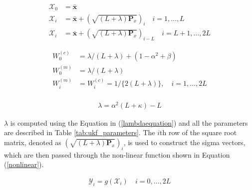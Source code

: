 \begin{equation}
\begin{aligned}
    \mathcal{X}_0 &= \bar{\mathbf{x}} \\
    \mathcal{X}_i &= \bar{\mathbf{x}} + \left(\sqrt{(L+\lambda)\mathbf{P}_x}\right)_i \quad i = 1,\ldots,L \\
    \mathcal{X}_i &= \bar{\mathbf{x}} + \left(\sqrt{(L+\lambda)\mathbf{P}_x}\right)_{i-L} \quad i = L+1,\ldots,2L
\end{aligned}
\label{ukf_equations1}
\end{equation}

\begin{equation}
\begin{aligned}
    W^{(c)}_0 &= \lambda / (L + \lambda) + (1-\alpha^2 +\beta) \\
    W^{(m)}_0 &= \lambda / (L + \lambda) \\
    W^{(m)}_i &= W^{(c)}_i  = 1/\{2(L + \lambda)\}, \quad i = 1,\ldots,2L\\    
\end{aligned}
\label{ukf_equations2}
\end{equation}

\begin{equation}
\begin{aligned}
    \lambda = \alpha^2(L+\kappa) - L
    \label{lambdaequation}
\end{aligned}
\end{equation}

\(\lambda\) is computed using the Equation in (\ref{lambdaequation}) and all the parameters are described in Table \ref{tab:ukf_parameters}. The \( i \)th row of the square root matrix, denoted as \( \left(\sqrt{(L+\lambda)\mathbf{P}_x}\right)_i \), is used to construct the sigma vectors, which are then passed through the non-linear function shown in Equation (\ref{nonlinear}).


\begin{equation}
    \begin{aligned}
        \mathcal{Y}_i = g(\mathcal{X}_i) \quad i = 0,\ldots,2L
    \end{aligned}
    \label{nonlinear}
\end{equation}

